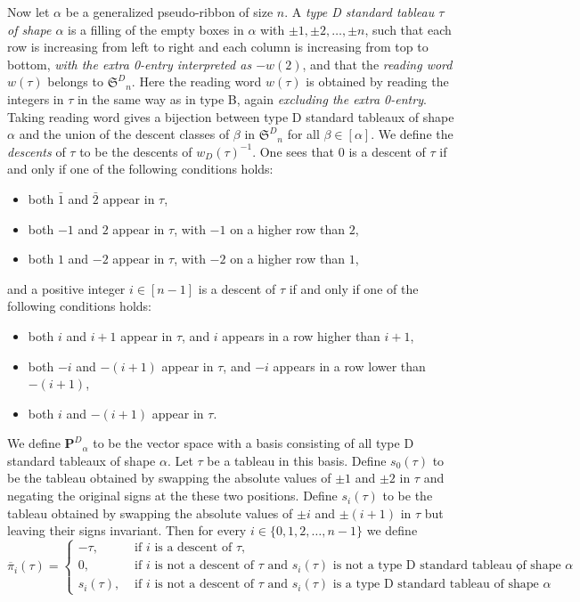 \documentclass{amsart}
\newtheorem*{Young's Rule}{Young's Rule}
\theoremstyle{definition}
\theoremstyle{remark}
\numberwithin{equation}{section}
\begin{document}
Now let $\alpha$ be a generalized pseudo-ribbon of size $n$. A \emph{type D standard tableau $\tau$ of shape $\alpha$} is a filling  of the empty boxes in $\alpha$ with $\pm1,\pm2,\ldots,\pm n$, such that each row is increasing from left to right and each column is increasing from top to bottom, \emph{with the extra 0-entry interpreted as $-w(2)$}, and that the \emph{reading word} $w(\tau)$ belongs to ${{\mathfrak S}^D}_n$. Here the reading word $w(\tau)$ is obtained by reading the integers in $\tau$ in the same way as in type B, again \emph{excluding the extra 0-entry}. Taking reading word gives a bijection between type D standard tableaux of shape $\alpha$ and the union of the descent classes of $\beta$ in ${{\mathfrak S}^D}_n$ for all $\beta\in[\alpha]$. We define the \emph{descents} of $\tau$ to be the descents of $w_D(\tau)^{-1}$. One sees that $0$ is a descent of $\tau$ if and only if one of the following conditions holds:
\begin{itemize}
\item
both $\bar 1$ and $\bar2$ appear in $\tau$, 
\item
both $-1$ and $2$ appear in $\tau$, with $-1$ on a higher row than $2$,
\item
both $1$ and $-2$ appear in $\tau$, with $-2$ on a higher row than $1$,
\end{itemize}
and a positive integer $i\in[n-1]$ is a descent of $\tau$ if and only if one of the following conditions holds:
\begin{itemize}
\item
both $i$ and $i+1$ appear in $\tau$, and $i$ appears in a row higher than $i+1$,
\item
both $-i$ and $-(i+1)$ appear in $\tau$, and $-i$ appears in a row lower than $-(i+1)$,
\item
both $i$ and $-(i+1)$ appear in $\tau$.
\end{itemize}
We define ${\mathbf{P}^D}_\alpha$ to be the vector space with a basis consisting of all type D standard tableaux of shape $\alpha$. Let $\tau$ be a tableau in this basis. Define $s_0(\tau)$ to be the tableau obtained by swapping the absolute values of $\pm1$ and $\pm2$ in $\tau$ and negating the original signs at the these two positions. Define $s_i(\tau)$ to be the tableau obtained by swapping the absolute values of $\pm i$ and $\pm(i+1)$ in $\tau$ but leaving their signs invariant. Then for every $i\in\{0,1,2,\ldots,n-1\}$ we define
\begin{equation}\label{eq:ActionB}
{\overline{\pi}}_i(\tau)=
\begin{cases}
-\tau, & \textrm{ if $i$ is a descent of $\tau$},\\
0, & \textrm{ if $i$ is not a descent of $\tau$ and $s_i(\tau)$ is not a type D standard tableau of shape $\alpha$},\\
s_i(\tau), & \textrm{ if $i$ is not a descent of $\tau$ and $s_i(\tau)$ is a type D standard tableau of shape $\alpha$}.
\end{cases}
\end{equation}
\end{document}
